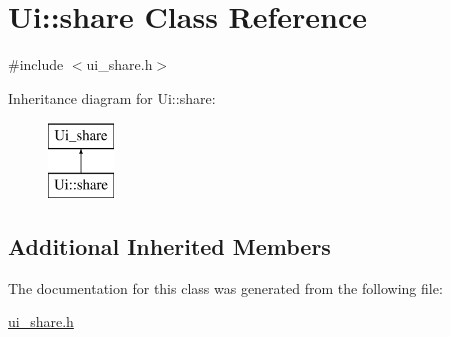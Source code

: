 \hypertarget{classUi_1_1share}{\section{Ui\-:\-:share Class Reference}
\label{classUi_1_1share}
}


{\ttfamily \#include $<$ui\-\_\-share.\-h$>$}

Inheritance diagram for Ui\-:\-:share\-:\begin{figure}[H]
\begin{center}
\leavevmode
\includegraphics[height=2.000000cm]{classUi_1_1share}
\end{center}
\end{figure}
\subsection*{Additional Inherited Members}


The documentation for this class was generated from the following file\-:\begin{DoxyCompactItemize}
\item 
\hyperlink{ui__share_8h}{ui\-\_\-share.\-h}\end{DoxyCompactItemize}
